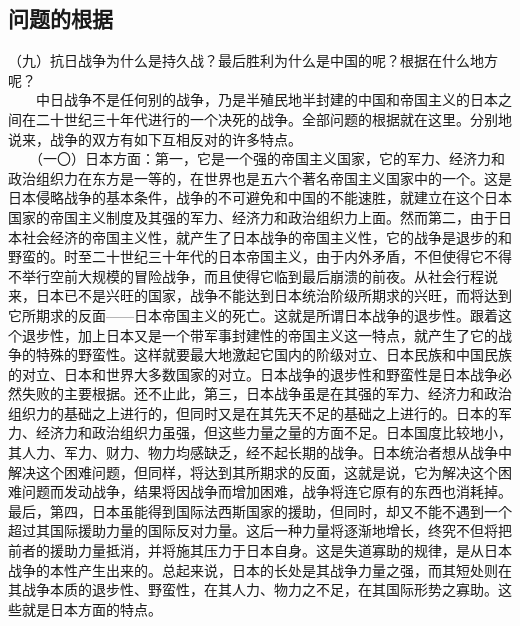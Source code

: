 \documentclass[cn,11pt,chinese]{elegantbook}
\def\myformat#1{\hfil\hfil #1}
\begin{document}
\subsection*{\myformat{问题的根据}}
（九）抗日战争为什么是持久战？最后胜利为什么是中国的呢？根据在什么地方呢？\\
　　中日战争不是任何别的战争，乃是半殖民地半封建的中国和帝国主义的日本之间在二十世纪三十年代进行的一个决死的战争。全部问题的根据就在这里。分别地说来，战争的双方有如下互相反对的许多特点。\\
　　（一〇）日本方面：第一，它是一个强的帝国主义国家，它的军力、经济力和政治组织力在东方是一等的，在世界也是五六个著名帝国主义国家中的一个。这是日本侵略战争的基本条件，战争的不可避免和中国的不能速胜，就建立在这个日本国家的帝国主义制度及其强的军力、经济力和政治组织力上面。然而第二，由于日本社会经济的帝国主义性，就产生了日本战争的帝国主义性，它的战争是退步的和野蛮的。时至二十世纪三十年代的日本帝国主义，由于内外矛盾，不但使得它不得不举行空前大规模的冒险战争，而且使得它临到最后崩溃的前夜。从社会行程说来，日本已不是兴旺的国家，战争不能达到日本统治阶级所期求的兴旺，而将达到它所期求的反面——日本帝国主义的死亡。这就是所谓日本战争的退步性。跟着这个退步性，加上日本又是一个带军事封建性的帝国主义这一特点，就产生了它的战争的特殊的野蛮性。这样就要最大地激起它国内的阶级对立、日本民族和中国民族的对立、日本和世界大多数国家的对立。日本战争的退步性和野蛮性是日本战争必然失败的主要根据。还不止此，第三，日本战争虽是在其强的军力、经济力和政治组织力的基础之上进行的，但同时又是在其先天不足的基础之上进行的。日本的军力、经济力和政治组织力虽强，但这些力量之量的方面不足。日本国度比较地小，其人力、军力、财力、物力均感缺乏，经不起长期的战争。日本统治者想从战争中解决这个困难问题，但同样，将达到其所期求的反面，这就是说，它为解决这个困难问题而发动战争，结果将因战争而增加困难，战争将连它原有的东西也消耗掉。最后，第四，日本虽能得到国际法西斯国家的援助，但同时，却又不能不遇到一个超过其国际援助力量的国际反对力量。这后一种力量将逐渐地增长，终究不但将把前者的援助力量抵消，并将施其压力于日本自身。这是失道寡助的规律，是从日本战争的本性产生出来的。总起来说，日本的长处是其战争力量之强，而其短处则在其战争本质的退步性、野蛮性，在其人力、物力之不足，在其国际形势之寡助。这些就是日本方面的特点。\\
\end{document}
